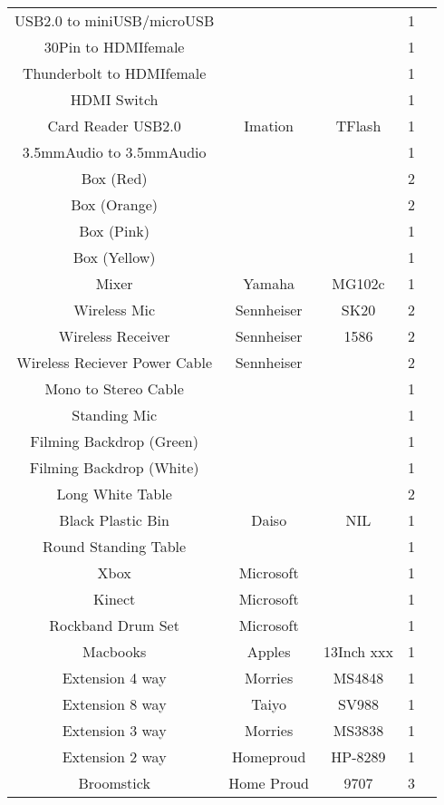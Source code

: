 \documentclass[DIV=classic,11pt,abstracton,numbers=noenddot,listof=totoc,bibliography=totoc,parskip]{scrartcl}
\begin{document}
\begin{tabular}{ccccc}
USB2.0 to miniUSB/microUSB &&& 1 & \\
30Pin to HDMIfemale &&& 1 & \\
Thunderbolt to HDMIfemale &&& 1 &\\
HDMI Switch &&& 1 & \\
Card Reader USB2.0 & Imation & TFlash & 1 & \\
3.5mmAudio to 3.5mmAudio &&& 1 &\\
Box (Red) &&& 2 & \\
Box (Orange) &&& 2 & \\
Box (Pink) &&& 1 & \\
Box (Yellow) &&& 1 & \\
Mixer & Yamaha & MG102c & 1 & \\
Wireless Mic & Sennheiser & SK20 & 2 & \\
Wireless Receiver & Sennheiser & 1586 & 2 &\\
Wireless Reciever Power Cable & Sennheiser &  & 2 &\\
Mono to Stereo Cable &  && 1 &\\
Standing Mic &&& 1 & \\
Filming Backdrop (Green) &&& 1 & \\
Filming Backdrop (White) &&& 1 & \\
Long White Table &&& 2 & \\
Black Plastic Bin & Daiso & NIL & 1 & \\
Round Standing Table & & & 1 & \\
Xbox & Microsoft & & 1 & \\
Kinect & Microsoft & & 1 & \\
Rockband Drum Set & Microsoft & & 1 & \\
Macbooks & Apples & 13Inch xxx & 1 & \\
Extension 4 way & Morries & MS4848 & 1 & \\
Extension 8 way & Taiyo & SV988 & 1 & \\
Extension 3 way & Morries & MS3838 & 1 & \\
Extension 2 way & Homeproud & HP-8289 & 1 & \\
Broomstick & Home Proud & 9707 & 3 & \\





	\bottomrule
		\end{tabular}
\end{document}
